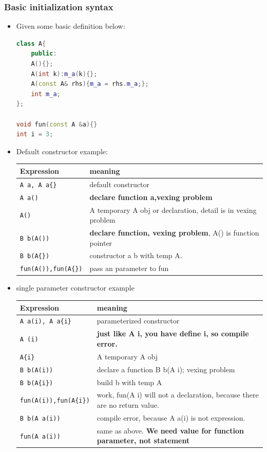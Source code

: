 \documentclass[a4paper,11pt,twoside]{book}
\newcommand{\tophline}{\hline }
\newcommand{\bottomhline}{\\ \hline }
\newcommand{\tophline}{ }
\newcommand{\bottomhline}{ }
\begin{document}
\subsubsection{Basic initialization syntax}
\begin{itemize}
	\item Given some basic definition below: 
\begin{lstlisting}[frame=single, language=c++]
class A{
	public:
	A(){};
	A(int k):m_a(k){};
	A(const A& rhs){m_a = rhs.m_a;};
	int m_a;
};

void fun(const A &a){}
int i = 3;	
\end{lstlisting}	
	
	\item Default constructor example: \newline
	\begin{tabular}{|p{}|p{}|}
		\tophline
		Expression & meaning \\
		\tophline
		\texttt{A a, A a\{\}} & default constructor \\
		\tophline
		\texttt{A a()} & \textbf{declare function a,vexing problem} \\
		\tophline
		\texttt{A()} & A temporary A obj or declaration, detail is in vexing problem \\
		\tophline
		\texttt{B b(A())} & \textbf{declare function, vexing problem}, A() is function pointer \\
		\tophline
		\texttt{B b(A\{\})} & constructor a b with temp A. \\
		\tophline
		\texttt{fun(A()),fun(A\{\})} & pass an parameter to fun
		\bottomhline
	\end{tabular}
	\item single parameter constructor example \newline
	
	\begin{tabular}{|p{}|p{}|}
		\tophline
		Expression & meaning \\
		\tophline
		\texttt{A a(i), A a\{i\}} & parameterized constructor\\
		\tophline
		\texttt{A (i)} & \textbf{just like A i, you have define i, so compile error.} \\
		\tophline
		\texttt{A\{i\}} & A temporary A obj\\
		\tophline
		\texttt{B b(A(i))} & declare a function B b(A i); vexing problem \\
		\tophline
		\texttt{B b(A\{i\})} & build b with temp A\\
		\tophline
		\texttt{fun(A(i)),fun(A\{i\})} & work, fun(A i) will not a declaration, because there are no return value.\\
		\tophline
		\texttt{B b(A a(i))}  & compile error, because A a(i) is not expression. \\
		\tophline
		\texttt{fun(A a(i))} & same as above. \textbf{We need value for function parameter, not statement} 
		\bottomhline
	\end{tabular}
	

\end{itemize}
\end{document}
